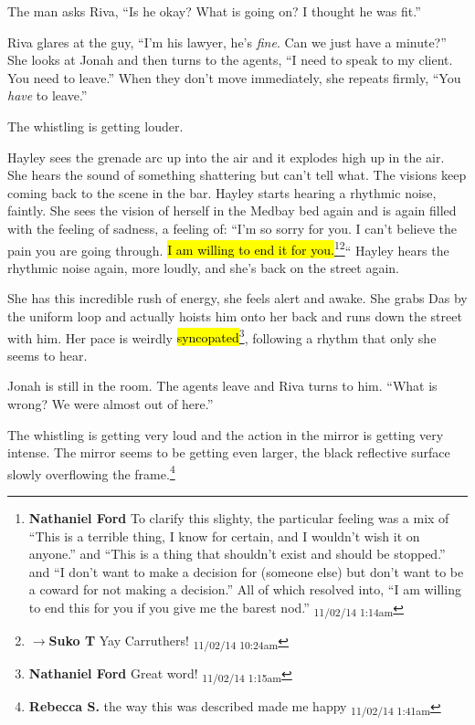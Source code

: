 The man asks Riva, ``Is he okay?  What is going on?  I thought he was fit.''

Riva glares at the guy, ``I'm his lawyer, he's \textit{fine}.  Can we just have a minute?''  She looks at Jonah and then turns to the agents, ``I need to speak to my client.  You need to leave.''  When they don't move immediately, she repeats firmly, ``You \textit{have }to leave.''

The whistling is getting louder.



Hayley sees the grenade arc up into the air and it explodes high up in the air.  She hears the sound of something shattering but can't tell what.  The visions keep coming back to the scene in the bar.  Hayley starts hearing a rhythmic noise, faintly.  She sees the vision of herself in the Medbay bed again and is again filled with the feeling of sadness, a feeling of: ``I'm so sorry for you. I can't believe the pain you are going through. \hl{I am willing to end it for you.}\footnote{\textbf{Nathaniel Ford }To clarify this slighty, the particular feeling was a mix of ``This is a terrible thing, I know for certain, and I wouldn't wish it on anyone.'' and ``This is a thing that shouldn't exist and should be stopped.'' and ``I don't want to make a decision for (someone else) but don't want to be a coward for not making a decision.'' All of which resolved into, ``I am willing to end this for you if you give me the barest nod.'' \textsubscript{11/02/14 1:14am}}\footnote{$\rightarrow$\textbf{Suko T }Yay Carruthers! \textsubscript{11/02/14 10:24am}}``  Hayley hears the rhythmic noise again, more loudly, and she's back on the street again.

She has this incredible rush of energy, she feels alert and awake.  She grabs Das by the uniform loop and actually hoists him onto her back and runs down the street with him.  Her pace is weirdly \hl{syncopated}\footnote{\textbf{Nathaniel Ford }Great word! \textsubscript{11/02/14 1:15am}}, following a rhythm that only she seems to hear.



Jonah is still in the room.  The agents leave and Riva turns to him.  ``What is wrong?  We were almost out of here.''

The whistling is getting very loud and the action in the mirror is getting very intense.  The mirror seems to be getting even larger, the black reflective surface slowly overflowing the frame.\footnote{\textbf{Rebecca S. }the way this was described made me happy \textsubscript{11/02/14 1:41am}}

